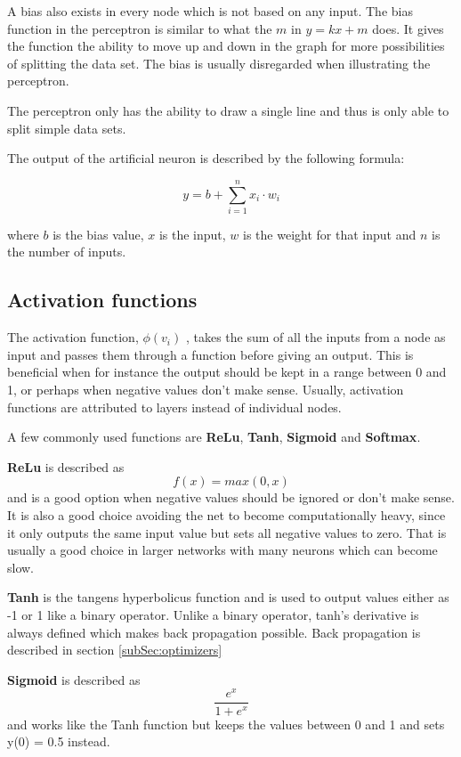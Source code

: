 A bias also exists in every node which is not based on any input. The bias function in the perceptron is similar to what the $m$ in $y = kx + m$ does. It gives the function the ability to move up and down in the graph for more possibilities of splitting the data set. The bias is usually disregarded when illustrating the perceptron.

The perceptron only has the ability to draw a single line and thus is only able to split simple data sets.

The output of the artificial neuron is described by the following formula:

\[ y = b + \displaystyle\sum_{i=1}^{n} x_i \cdot w_i \]

where $b$ is the bias value, $x$ is the input, $w$ is the weight for that input and $n$ is the number of inputs.

\subsection{Activation functions}
\label{subsec:activationfunctions}
The activation function,  $ \phi (v_{i}) $ , takes the sum of all the inputs from a node as input and passes them through a function before giving an output. This is beneficial when for instance the output should be kept in a range between 0 and 1, or perhaps when negative values don't make sense.
Usually, activation functions are attributed to layers instead of individual nodes.

A few commonly used functions are \textbf{ReLu}, \textbf{Tanh}, \textbf{Sigmoid} and \textbf{Softmax}.

\textbf{ReLu} is described as
\[f(x) = max(0, x)\]
and is a good option when negative values should be ignored or don't make sense. 
It is also a good choice avoiding the net to become computationally heavy,
since it only outputs the same input value but sets all negative values to zero.
That is usually a good choice in larger networks with many neurons which can become
slow.

\textbf{Tanh} is the tangens hyperbolicus function and is used to output values either as -1 or 1 like a binary operator. Unlike a binary operator, tanh's derivative is always defined which makes back propagation possible.
Back propagation is described in section \ref{subSec:optimizers}

\textbf{Sigmoid} is described as 
\[\frac{e^x}{1+e^x}\]
and works like the Tanh function but keeps the values between 0 and 1 and sets y(0) = 0.5 instead.

